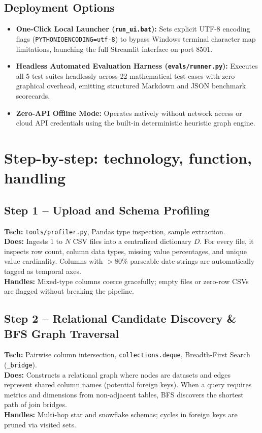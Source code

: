 \documentclass[11pt,a4paper]{article}
\begin{document}
\subsection{Deployment Options}
\begin{itemize}[leftmargin=1.0cm]
\item \textbf{One-Click Local Launcher (\texttt{run\_ui.bat}):} Sets explicit UTF-8 encoding flags (\texttt{PYTHONIOENCODING=utf-8}) to bypass Windows terminal character map limitations, launching the full Streamlit interface on port 8501.
\item \textbf{Headless Automated Evaluation Harness (\texttt{evals/runner.py}):} Executes all 5 test suites headlessly across 22 mathematical test cases with zero graphical overhead, emitting structured Markdown and JSON benchmark scorecards.
\item \textbf{Zero-API Offline Mode:} Operates natively without network access or cloud API credentials using the built-in deterministic heuristic graph engine.
\end{itemize}

\newpage
\section{Step-by-step: technology, function, handling}

\subsection{Step 1 -- Upload and Schema Profiling}
\textbf{Tech:} \texttt{tools/profiler.py}, Pandas type inspection, sample extraction.\\
\textbf{Does:} Ingests 1 to $N$ CSV files into a centralized dictionary $D$. For every file, it inspects row count, column data types, missing value percentages, and unique value cardinality. Columns with $>80\%$ parseable date strings are automatically tagged as temporal axes.\\
\textbf{Handles:} Mixed-type columns coerce gracefully; empty files or zero-row CSVs are flagged without breaking the pipeline.

\subsection{Step 2 -- Relational Candidate Discovery \& BFS Graph Traversal}
\textbf{Tech:} Pairwise column intersection, \texttt{collections.deque}, Breadth-First Search (\texttt{\_bridge}).\\
\textbf{Does:} Constructs a relational graph where nodes are datasets and edges represent shared column names (potential foreign keys). When a query requires metrics and dimensions from non-adjacent tables, BFS discovers the shortest path of join bridges.\\
\textbf{Handles:} Multi-hop star and snowflake schemas; cycles in foreign keys are pruned via visited sets.
\end{document}

